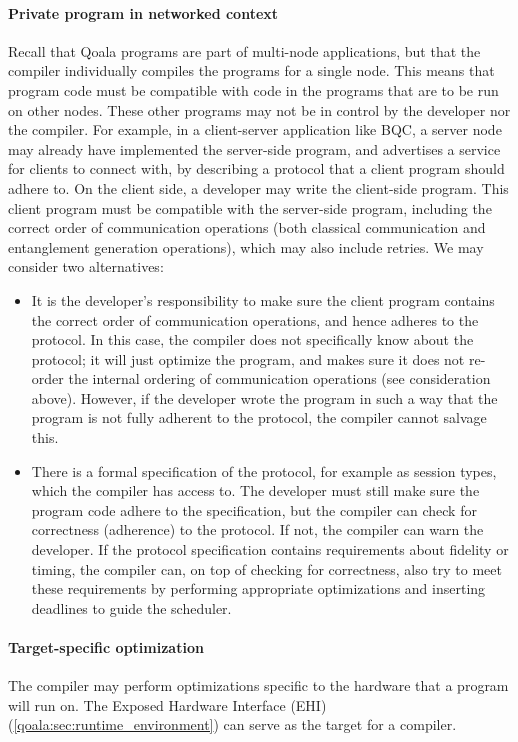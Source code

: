\paragraph{Private program in networked context}
Recall that Qoala programs are part of multi-node applications, but that the compiler individually compiles the programs for a single node.
This means that program code must be compatible with code in the programs that are to be run on other nodes.
These other programs may not be in control by the developer nor the compiler.
For example, in a client-server application like BQC, a server node may already have implemented the server-side program, and advertises a service for clients to connect with, by describing a protocol that a client program should adhere to.
On the client side, a developer may write the client-side program.
This client program must be compatible with the server-side program, including the correct order of communication operations (both classical communication and entanglement generation operations), which may also include retries.
We may consider two alternatives:
\begin{itemize}
  \item It is the developer's responsibility to make sure the client program contains the correct order of communication operations, and hence adheres to the protocol.
  In this case, the compiler does not specifically know about the protocol; it will just optimize the program, and makes sure it does not re-order the internal ordering of communication operations (see consideration above).
  However, if the developer wrote the program in such a way that the program is not fully adherent to the protocol, the compiler cannot salvage this.
  \item There is a formal specification of the protocol, for example as session types, which the compiler has access to.
  The developer must still make sure the program code adhere to the specification, but the compiler can check for correctness (adherence) to the protocol.
  If not, the compiler can warn the developer.
  If the protocol specification contains requirements about fidelity or timing, the compiler can, on top of checking for correctness, also try to meet these requirements by performing appropriate optimizations and inserting deadlines to guide the scheduler.
\end{itemize}

\paragraph{Target-specific optimization}
The compiler may perform optimizations specific to the hardware that a program will run on.
The Exposed Hardware Interface (EHI) (\cref{qoala:sec:runtime_environment}) can serve as the target for a compiler.



